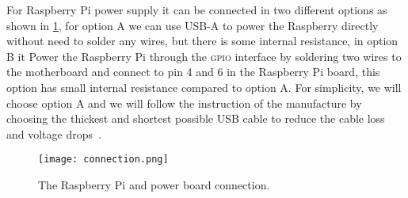 \documentclass[../main.tex]{subfiles}
\begin{document}
For Raspberry Pi power supply it can be connected in 
two different options as shown in \cref{fig:connection}, 
for option A we can use USB-A to power the Raspberry directly without
need to solder any wires,
but there is some internal resistance,
in option B it Power the Raspberry Pi through the \textsc{gpio} 
interface by soldering two wires to the motherboard and 
connect to pin 4 and 6 in the Raspberry Pi board,
this option has small internal resistance compared to option A.
For simplicity, we will choose option A and we will 
follow the instruction of the manufacture by choosing 
the thickest and shortest possible USB cable to reduce 
the cable loss and voltage drops~\cite{makerfocus}. 	 
 
 \begin{figure}[h]
 	\centering
 	\texttt{[image: connection.png]}
 	\caption{The Raspberry Pi and power board connection.}
 	\label{fig:connection}
 \end{figure}   
\end{document}
